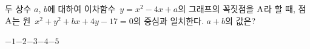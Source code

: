 두 상수 $a$, $b$에 대하여 이차함수~$y=x^2-4x+a$의 그래프의 꼭짓점을 $\mathrm{A}$라 할 때, 점~$\mathrm{A}$는 원~$x^2+y^2+bx+4y-17=0$의 중심과 일치한다. $a+b$의 값은?
\begin{choices32}{$-1$}{$-2$}{$-3$}{$-4$}{$-5$}\end{choices32}
